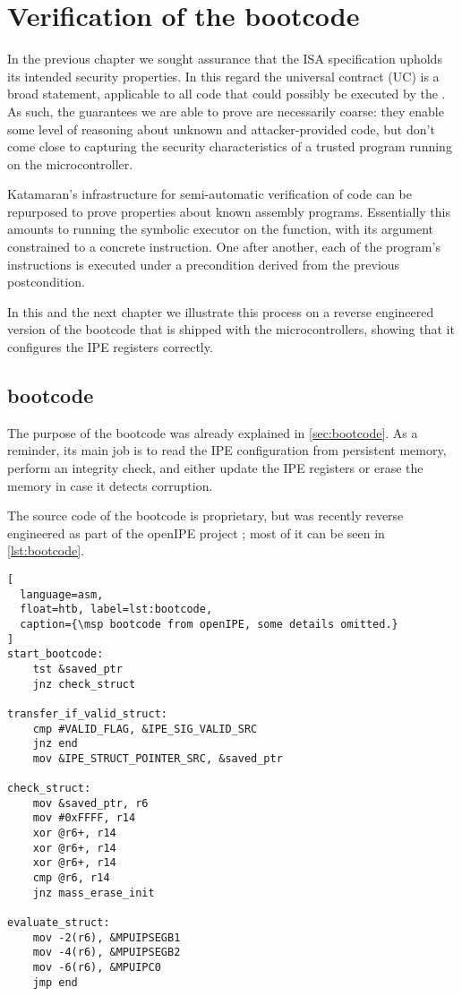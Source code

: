 \chapter{Verification of the \texorpdfstring{\msp}{MSP430} bootcode}
\label{ch:block-verifier}

In the previous chapter we sought assurance that the ISA specification upholds its intended security properties. In this regard the universal contract (UC) is a broad statement, applicable to all code that could possibly be executed by the \msp. As such, the guarantees we are able to prove are necessarily coarse: they enable some level of reasoning about unknown and attacker-provided code, but don't come close to capturing the security characteristics of a trusted program running on the microcontroller.

Katamaran's infrastructure for semi-automatic verification of \usail code can be repurposed to prove properties about known assembly programs. Essentially this amounts to running the symbolic executor on the  function, with its argument constrained to a concrete instruction. One after another, each of the program's instructions is executed under a precondition derived from the previous postcondition.

In this and the next chapter we illustrate this process on a reverse engineered version \cite{Bognar2025} of the bootcode that is shipped with the \msp microcontrollers, showing that it configures the IPE registers correctly.

\section{\texorpdfstring{\msp}{MSP430} bootcode}

The purpose of the bootcode was already explained in \cref{sec:bootcode}. As a reminder, its main job is to read the IPE configuration from persistent memory, perform an integrity check, and either update the IPE registers or erase the memory in case it detects corruption.

The source code of the bootcode is proprietary, but was recently reverse engineered as part of the openIPE project \cite{Bognar2025}; most of it can be seen in \cref{lst:bootcode}.

\begin{lstlisting}[
  language=asm,
  float=htb, label=lst:bootcode,
  caption={\msp bootcode from openIPE, some details omitted.}
]
start_bootcode:
    tst &saved_ptr
    jnz check_struct

transfer_if_valid_struct:
    cmp #VALID_FLAG, &IPE_SIG_VALID_SRC
    jnz end
    mov &IPE_STRUCT_POINTER_SRC, &saved_ptr

check_struct:
    mov &saved_ptr, r6
    mov #0xFFFF, r14
    xor @r6+, r14
    xor @r6+, r14
    xor @r6+, r14
    cmp @r6, r14
    jnz mass_erase_init

evaluate_struct:
    mov -2(r6), &MPUIPSEGB1
    mov -4(r6), &MPUIPSEGB2
    mov -6(r6), &MPUIPC0
    jmp end
\end{lstlisting}

